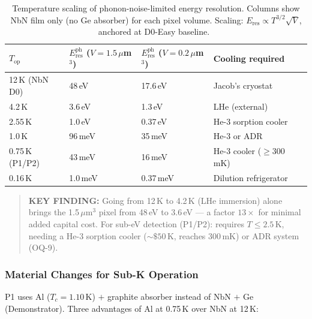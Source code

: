 \begin{table}[ht]
\centering
\caption{Temperature scaling of phonon-noise-limited energy resolution.
  Columns show NbN film only (no Ge absorber) for each pixel volume.
  Scaling: $E_\mathrm{res} \propto T^{3/2} \sqrt{V}$, anchored at D0-Easy baseline.~\cite{Richards1994}}
\label{tab:q7_T_scaling}
\small
\begin{tabular}{@{}lllll@{}}
\toprule
$T_\mathrm{op}$ & $E_\mathrm{res}^\mathrm{ph}$ ($V = 1.5\,\mu$m$^3$)
  & $E_\mathrm{res}^\mathrm{ph}$ ($V = 0.2\,\mu$m$^3$)
  & Cooling required \\
\midrule
12\,K (NbN D0)   & 48\,eV   & 17.6\,eV  & Jacob's cryostat \\
4.2\,K           & 3.6\,eV  & 1.3\,eV   & LHe (external) \\
2.55\,K          & 1.0\,eV  & 0.37\,eV  & He-3 sorption cooler \\
1.0\,K           & 96\,meV  & 35\,meV   & He-3 or ADR \\
0.75\,K (P1/P2)  & 43\,meV  & 16\,meV   & He-3 cooler ($\geq 300$\,mK) \\
0.16\,K          & 1.0\,meV & 0.37\,meV & Dilution refrigerator \\
\bottomrule
\end{tabular}
\end{table}

\begin{quote}
\textbf{KEY FINDING:}
Going from 12\,K to 4.2\,K (LHe immersion) alone brings the 1.5\,$\mu$m$^3$
pixel from 48\,eV to 3.6\,eV --- a factor $13\times$ for minimal added capital cost.
For sub-eV detection (P1/P2): requires $T \leq 2.5$\,K, needing a He-3
sorption cooler ($\sim\!\$50$\,K, reaches 300\,mK) or ADR system (OQ-9).
\end{quote}

\subsubsection{Material Changes for Sub-K Operation}
\label{sec:q7_material}

P1 uses Al ($T_c = 1.10$\,K) $+$ graphite absorber instead of NbN $+$ Ge
(Demonstrator). Three advantages of Al at 0.75\,K over NbN at 12\,K:


